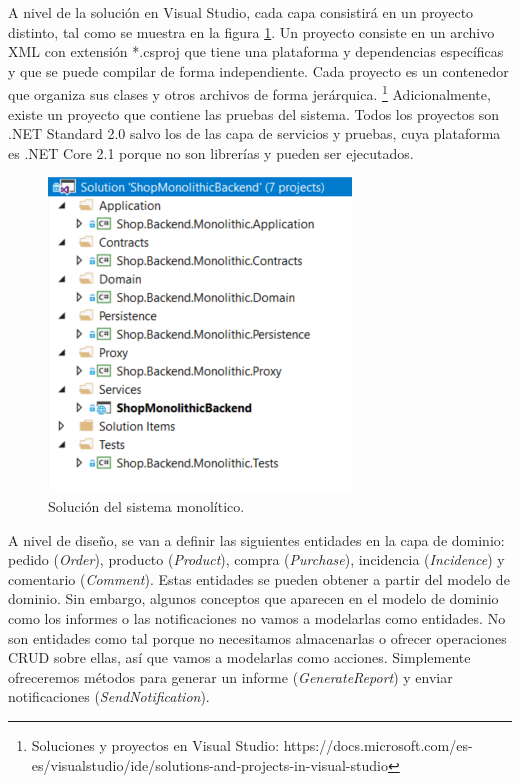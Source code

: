 \documentclass[11pt,spanish,listoffigures]{tfgetsinf}
\begin{document}
A nivel de la solución en Visual Studio, cada capa consistirá en un proyecto distinto, tal como se muestra en la figura \ref{fig:MonolithicSolution}. Un proyecto consiste en un archivo XML con extensión *.csproj que tiene una plataforma y dependencias específicas y que se puede compilar de forma independiente. Cada proyecto es un contenedor que organiza sus clases y otros archivos de forma jerárquica. \footnote{ Soluciones y proyectos en Visual Studio: https://docs.microsoft.com/es-es/visualstudio/ide/solutions-and-projects-in-visual-studio} Adicionalmente, existe un proyecto que contiene las pruebas del sistema. Todos los proyectos son .NET Standard 2.0 salvo los de las capa de servicios y pruebas, cuya plataforma es .NET Core 2.1 porque no son librerías y pueden ser ejecutados.

\begin{figure}[h]
\centering
\includegraphics[scale=0.8]{MonolithicSolution}
\caption{Solución del sistema monolítico.}
\label{fig:MonolithicSolution}
\end{figure}

A nivel de diseño, se van a definir las siguientes entidades en la capa de dominio: pedido (\textit{Order}), producto (\textit{Product}), compra (\textit{Purchase}), incidencia (\textit{Incidence}) y comentario (\textit{Comment}). Estas entidades se pueden obtener a partir del modelo de dominio. Sin embargo, algunos conceptos que aparecen en el modelo de dominio como los informes o las notificaciones no vamos a modelarlas como entidades. No son entidades como tal porque no necesitamos almacenarlas o ofrecer operaciones CRUD sobre ellas, así que vamos a modelarlas como acciones. Simplemente ofreceremos métodos para generar un informe (\textit{GenerateReport}) y enviar notificaciones (\textit{SendNotification}).
\end{document}
